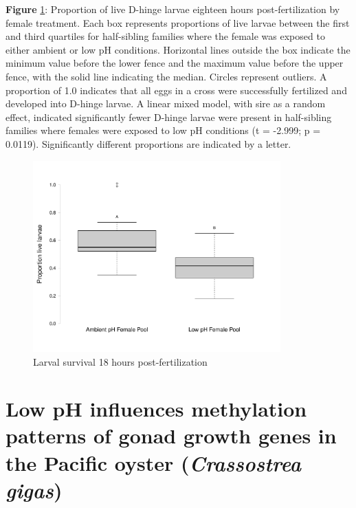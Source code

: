 \documentclass [11pt, proquest] {uwthesis}[2015/03/03]
\begin{document}
\textbf{Figure} \ref{fig:carryoverboxplot}: Proportion of live D-hinge larvae eighteen hours post-fertilization by female treatment. Each box represents proportions of live larvae between the first and third quartiles for half-sibling families where the female was exposed to either ambient or low pH conditions. Horizontal lines outside the box indicate the minimum value before the lower fence and the maximum value before the upper fence, with the solid line indicating the median. Circles represent outliers. A proportion of 1.0 indicates that all eggs in a cross were successfully fertilized and developed into D-hinge larvae. A linear mixed model, with sire as a random effect, indicated significantly fewer D-hinge larvae were present in half-sibling families where females were exposed to low pH conditions (t = -2.999; p = 0.0119). Significantly different proportions are indicated by a letter.\newline 
\begin{figure}[h]
\centering
  \includegraphics[width=0.85\textwidth]{figure/Ch2/Figure2.2.pdf}
  \caption{Larval survival 18 hours post-fertilization}
  \label{fig:carryoverboxplot}
\end{figure}
\clearpage

\hypertarget{low-ph-influences-methylation-patterns-of-gonad-growth-genes-in-the-pacific-oyster-crassostrea-gigas}{%
\chapter{\texorpdfstring{Low pH influences methylation patterns of gonad growth genes in the Pacific oyster (\emph{Crassostrea gigas})}{Low pH influences methylation patterns of gonad growth genes in the Pacific oyster (Crassostrea gigas)}}\label{low-ph-influences-methylation-patterns-of-gonad-growth-genes-in-the-pacific-oyster-crassostrea-gigas}}
\end{document}
